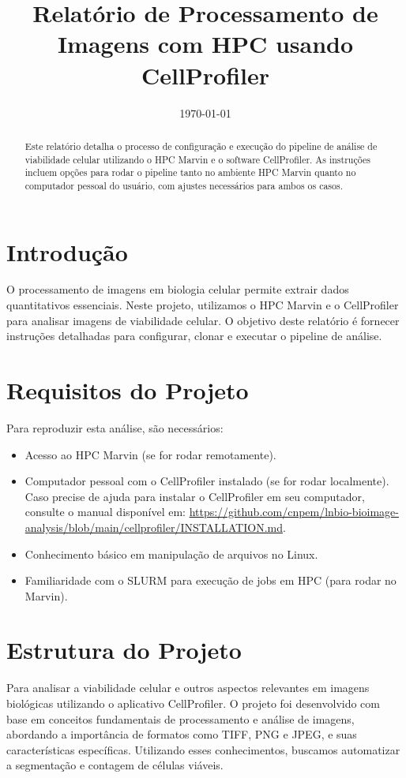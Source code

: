 \documentclass[a4paper, 12pt]{article}
\title{Relatório de Processamento de Imagens com HPC usando CellProfiler}
\date{\today}
\begin{document}
\maketitle

\begin{abstract}
Este relatório detalha o processo de configuração e execução do pipeline de análise de viabilidade celular utilizando o HPC Marvin e o software CellProfiler. As instruções incluem opções para rodar o pipeline tanto no ambiente HPC Marvin quanto no computador pessoal do usuário, com ajustes necessários para ambos os casos.
\end{abstract}

\section{Introdução}

O processamento de imagens em biologia celular permite extrair dados quantitativos essenciais. Neste projeto, utilizamos o HPC Marvin e o CellProfiler para analisar imagens de viabilidade celular. O objetivo deste relatório é fornecer instruções detalhadas para configurar, clonar e executar o pipeline de análise.


\section{Requisitos do Projeto}

Para reproduzir esta análise, são necessários:
\begin{itemize}
    \item Acesso ao HPC Marvin (se for rodar remotamente).
    \item Computador pessoal com o CellProfiler instalado (se for rodar localmente). Caso precise de ajuda para instalar o CellProfiler em seu computador, consulte o manual disponível em: \url{https://github.com/cnpem/lnbio-bioimage-analysis/blob/main/cellprofiler/INSTALLATION.md}.
    \item Conhecimento básico em manipulação de arquivos no Linux.
    \item Familiaridade com o SLURM para execução de jobs em HPC (para rodar no Marvin).
\end{itemize}

\section{Estrutura do Projeto}

Para analisar a viabilidade celular e outros aspectos relevantes em imagens biológicas utilizando o aplicativo CellProfiler. O projeto foi desenvolvido com base em conceitos fundamentais de processamento e análise de imagens, abordando a importância de formatos como TIFF, PNG e JPEG, e suas características específicas. Utilizando esses conhecimentos, buscamos automatizar a segmentação e contagem de células viáveis.
\end{document}

